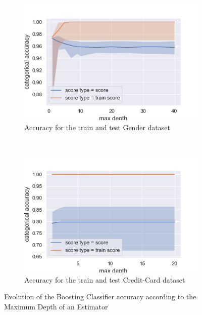 \documentclass[10pt]{article}
\begin{document}
		\paragraph*{}
			\begin{figure}[h]
				\centering
				\begin{subfigure}[]{0.45\columnwidth}
					\centering
					\includegraphics[width=\linewidth]{../graphics/boost_gender_max_depth_score_type_score_type.png}
					\caption{Accuracy for the train and test Gender dataset}
					\label{boost:g_train_vs_test}
				\end{subfigure}
				~
				\begin{subfigure}[]{0.45\columnwidth}
					\centering
					\includegraphics[width=\linewidth]{../graphics/boost_creditcard_max_depth_score_type_score_type.png}
					\caption{Accuracy for the train and test Credit-Card dataset}
					\label{boost:cc_train_vs_test}
				\end{subfigure}
				\caption{Evolution of the Boosting Classifier accuracy according to the Maximum Depth of an Estimator}
				\label{boost:train_vs_test}
			\end{figure}
\end{document}
